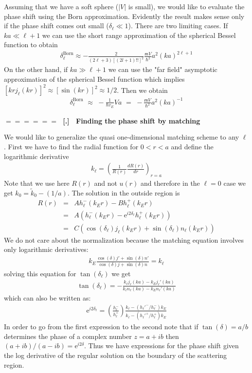 \documentclass[onecolumn,fleqn]{revtex4}
\newcommand{\eexp}{\mathrm{e}^}
\newcommand{\mass}{\mathsf{m}}
\newcommand{\tbox}[1]{\text{#1}}
\newcommand{\beq}{\begin{eqnarray}}
\newcommand{\eeq}{\end{eqnarray}}
\renewcommand{\thesubsection}{\arabic{subsection}}
\renewcommand{\thesubsubsection}{\arabic{subsubsection}}
\newcommand{\sheadC}[1]
{
\addtocounter{subsubsection}{1}
\vspace{5mm}
{\Large\bf $=\!=\!=\!=\!=\!=\;$ [\thesubsection.\thesubsubsection] \ #1}  
\nopagebreak
\phantomsection
}
\begin{document}
Assuming that we have a soft sphere ($|V|$ is small), 
we would  like to evaluate the phase shift using the Born approximation. 
Evidently the result makes sense only if the 
phase shift comes out small ($\delta_{\ell} \ll 1$). 
There are two limiting cases. 
If $ka \ll \ell{+}1$  we can use the short 
range approximation of the spherical Bessel 
function to obtain 
\beq
\delta^{\tbox{Born}}_{\ell}\approx
-\frac{2}{(2\ell+3)\left[(2l+1)!!\right]^2}
\frac{\mass V}{\hbar^2}a^2(ka)^{2\ell+1} 
\eeq
On the other hand, if $ka \gg \ell{+}1$ we can use 
the "far field" asymptotic approximation of 
the spherical Bessel function which implies 
$\left[ kr j_{\ell}(kr) \right ]^2 \approx [\sin(kr)]^2 \approx 1/2$. 
Then we obtain
\beq
\delta^{\tbox{Born}}_{\ell} \,\,\approx\,\,
-\frac{1}{\hbar v_E} V a \,\,=\,\,
-\frac{\mass V}{\hbar^2} a^2 (ka)^{-1}  
\eeq




\sheadC{Finding the phase shift by matching} 

We would like to generalize the quasi one-dimensional 
matching scheme to any $\ell$.  
First we have to find the radial function 
for $0<r<a$ and define the logarithmic derivative  
\beq
k_{\ell} = \left(\frac{1}{R(r)}\frac{dR(r)}{dr}\right)_{r=a}
\eeq
Note that we use here $R(r)$ and not $u(r)$ 
and therefore in the $\ell=0$ case we
get ${k_0=\tilde{k}_0-(1/a)}$. The solution in 
the outside region is
\beq
R(r) &=& A h_{\ell}^{-}(k_E r) - B h_{\ell}^{+}(k_E r) 
\\ \nonumber
&=&  A( h_{\ell}^{-}(k_E r) - \eexp{i2\delta_{\ell}} h_{\ell}^{+}(k_E r) ) 
\\ \nonumber
&=& C (\cos(\delta_{\ell})j_{\ell}(k_Er) + \sin(\delta_{\ell})n_{\ell}(k_Er)) 
\eeq
We do not care about the normalization because 
the matching equation involves only logarithmic derivatives:
\beq
k_E\frac{\cos(\delta)j'+\sin(\delta)n'}{\cos(\delta)j+\sin(\delta)n}=k_{\ell}
\eeq
solving this equation for $\tan(\delta_{\ell})$ we get
\beq
\tan(\delta_{\ell})
=-\frac{k_{\ell}j_{\ell}(ka)-k_E j_{\ell}'(ka)}{k_{\ell} n_{\ell} (ka) -k_E n_{\ell}'(ka)}
\eeq
which can also be written as:
\beq
\eexp{i2\delta_{\ell}} = 
\left( \frac{h_{\ell}^{-}}{h_{\ell}^{+}} \right) 
\frac
{ k_{\ell} - ( h_{\ell}'^{-} / h_{\ell}^{-} ) k_E}
{ k_{\ell} - ( h_{\ell}'^{+} / h_{\ell}^{+} ) k_E}
\eeq
In order to go from the first expression to the second 
note that if ${\tan(\delta)=a/b}$ determines 
the phase of a complex number ${z=a+ib}$   
then ${(a+ib)/(a-ib)=\eexp{i2\delta}}$. 
Thus we have expressions for the phase shift given 
the log derivative of the regular solution on the 
boundary of the scattering region.
\end{document}
